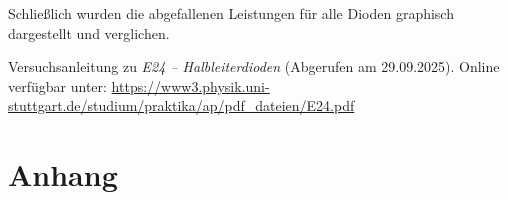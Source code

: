 \documentclass[
12pt,
a4paper,
bibliography=totocnumbered, %
BCOR=1cm, %
oneside, %
]{scrartcl}
\begin{document}
Schließlich wurden die abgefallenen Leistungen für alle Dioden graphisch dargestellt und verglichen.

\begin{thebibliography}{999}
	 Versuchsanleitung zu \emph{E24 -- Halbleiterdioden} (Abgerufen am 29.09.2025).
	Online verfügbar unter: \url{https://www3.physik.uni-stuttgart.de/studium/praktika/ap/pdf_dateien/E24.pdf}
\end{thebibliography}

\section{Anhang}


\end{document}
